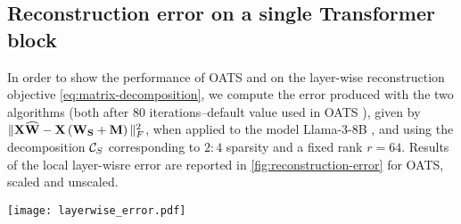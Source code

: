 \subsection{Reconstruction error on a single Transformer block}
In order to show the performance of OATS and \ourframework on the layer-wise reconstruction objective \eqref{eq:matrix-decomposition}, we compute the error produced with the two algorithms (both after $80$ iterations--default value used in OATS \cite{zhang2024oats}), given by $\|\mathbf{X} \widehat{\mathbf{W}}-\mathbf{X} \left({\mathbf{W_S} + \mathbf{M}}\right)\|_F^2$, when applied to the model Llama-3-8B \cite{dubey2024llama}, and using the decomposition $\mathcal{C}_S$ corresponding to $2:4$ sparsity and a fixed rank $r = 64$. Results of the local layer-wisre error are reported in \cref{fig:reconstruction-error} for OATS, \ourframework scaled and \ourframework unscaled.

\vspace{-20pt}
\begin{minipage}[t]{0.49\textwidth}
    \raggedleft
    \vspace{30pt}
    \label{fig:reconstruction-error}
\end{minipage}
\begin{minipage}[t]{0.49\textwidth}
    \vspace{0pt}
    \centering
    \texttt{[image: layerwise\_error.pdf]}
\end{minipage}
\vspace{-\baselineskip}